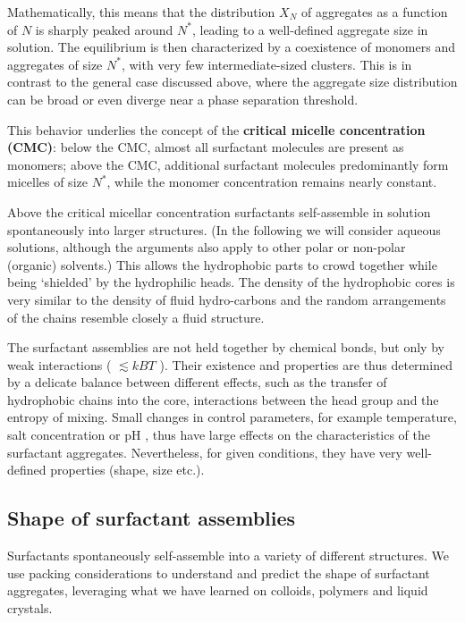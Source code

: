 \documentclass[
  letterpaper,
  enabledeprecatedfontcommands]{report}
\begin{document}
Mathematically, this means that the distribution \(X_N\) of aggregates
as a function of \(N\) is sharply peaked around \(N^*\), leading to a
well-defined aggregate size in solution. The equilibrium is then
characterized by a coexistence of monomers and aggregates of size
\(N^*\), with very few intermediate-sized clusters. This is in contrast
to the general case discussed above, where the aggregate size
distribution can be broad or even diverge near a phase separation
threshold.

This behavior underlies the concept of the \textbf{critical micelle
concentration (CMC)}: below the CMC, almost all surfactant molecules are
present as monomers; above the CMC, additional surfactant molecules
predominantly form micelles of size \(N^*\), while the monomer
concentration remains nearly constant.

Above the critical micellar concentration surfactants self-assemble in
solution spontaneously into larger structures. (In the following we will
consider aqueous solutions, although the arguments also apply to other
polar or non-polar (organic) solvents.) This allows the hydrophobic
parts to crowd together while being `shielded' by the hydrophilic heads.
The density of the hydrophobic cores is very similar to the density of
fluid hydro-carbons and the random arrangements of the chains resemble
closely a fluid structure.

The surfactant assemblies are not held together by chemical bonds, but
only by weak interactions ( \(\lesssim k B T\) ). Their existence and
properties are thus determined by a delicate balance between different
effects, such as the transfer of hydrophobic chains into the core,
interactions between the head group and the entropy of mixing. Small
changes in control parameters, for example temperature, salt
concentration or pH , thus have large effects on the characteristics of
the surfactant aggregates. Nevertheless, for given conditions, they have
very well-defined properties (shape, size etc.).

\subsection{Shape of surfactant
assemblies}\label{shape-of-surfactant-assemblies}

Surfactants spontaneously self-assemble into a variety of different
structures. We use packing considerations to understand and predict the
shape of surfactant aggregates, leveraging what we have learned on
colloids, polymers and liquid crystals.
\end{document}
